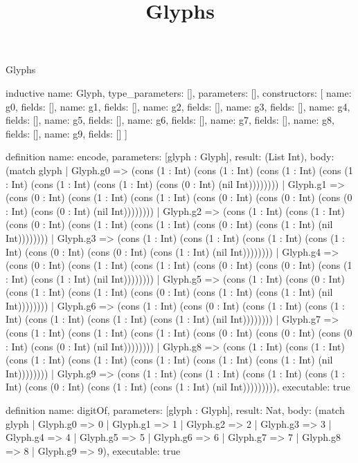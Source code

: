 \begin{lexlean}{Glyphs}
\title{Glyphs}
\begin{semanticmodule}
inductive{
  name: Glyph,
  type_parameters: [],
  parameters: [],
  constructors: [
    {name: g0, fields: []},
    {name: g1, fields: []},
    {name: g2, fields: []},
    {name: g3, fields: []},
    {name: g4, fields: []},
    {name: g5, fields: []},
    {name: g6, fields: []},
    {name: g7, fields: []},
    {name: g8, fields: []},
    {name: g9, fields: []}
  ]
}

definition{
  name: encode,
  parameters: [glyph : Glyph],
  result: (List Int),
  body: (match glyph
    | Glyph.g0 => (cons (1 : Int) (cons (1 : Int) (cons (1 : Int) (cons (1 : Int) (cons (1 : Int) (cons (1 : Int) (cons (0 : Int) (nil Int))))))))
    | Glyph.g1 => (cons (0 : Int) (cons (1 : Int) (cons (1 : Int) (cons (0 : Int) (cons (0 : Int) (cons (0 : Int) (cons (0 : Int) (nil Int))))))))
    | Glyph.g2 => (cons (1 : Int) (cons (1 : Int) (cons (0 : Int) (cons (1 : Int) (cons (1 : Int) (cons (0 : Int) (cons (1 : Int) (nil Int))))))))
    | Glyph.g3 => (cons (1 : Int) (cons (1 : Int) (cons (1 : Int) (cons (1 : Int) (cons (0 : Int) (cons (0 : Int) (cons (1 : Int) (nil Int))))))))
    | Glyph.g4 => (cons (0 : Int) (cons (1 : Int) (cons (1 : Int) (cons (0 : Int) (cons (0 : Int) (cons (1 : Int) (cons (1 : Int) (nil Int))))))))
    | Glyph.g5 => (cons (1 : Int) (cons (0 : Int) (cons (1 : Int) (cons (1 : Int) (cons (0 : Int) (cons (1 : Int) (cons (1 : Int) (nil Int))))))))
    | Glyph.g6 => (cons (1 : Int) (cons (0 : Int) (cons (1 : Int) (cons (1 : Int) (cons (1 : Int) (cons (1 : Int) (cons (1 : Int) (nil Int))))))))
    | Glyph.g7 => (cons (1 : Int) (cons (1 : Int) (cons (1 : Int) (cons (0 : Int) (cons (0 : Int) (cons (0 : Int) (cons (0 : Int) (nil Int))))))))
    | Glyph.g8 => (cons (1 : Int) (cons (1 : Int) (cons (1 : Int) (cons (1 : Int) (cons (1 : Int) (cons (1 : Int) (cons (1 : Int) (nil Int))))))))
    | Glyph.g9 => (cons (1 : Int) (cons (1 : Int) (cons (1 : Int) (cons (1 : Int) (cons (0 : Int) (cons (1 : Int) (cons (1 : Int) (nil Int))))))))),
  executable: true
}

definition{
  name: digitOf,
  parameters: [glyph : Glyph],
  result: Nat,
  body: (match glyph
    | Glyph.g0 => 0
    | Glyph.g1 => 1
    | Glyph.g2 => 2
    | Glyph.g3 => 3
    | Glyph.g4 => 4
    | Glyph.g5 => 5
    | Glyph.g6 => 6
    | Glyph.g7 => 7
    | Glyph.g8 => 8
    | Glyph.g9 => 9),
  executable: true
}


\end{semanticmodule}
\end{lexlean}
